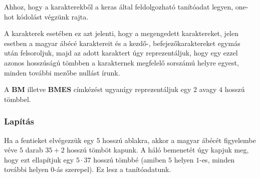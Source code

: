 \documentclass[a4paper, magyar]{article}
\begin{document}
Ahhoz, hogy a karakterekből a keras által feldolgozható tanítóadat legyen, one-hot kódolást végzünk rajta. 

A karakterek esetében ez azt jelenti, hogy a megengedett karaktereket, jelen esetben a magyar ábécé karaktereit és a kezdő-, befejezőkaraktereket egymás után felsoroljuk, majd az adott karaktert úgy reprezentáljuk, hogy egy ezzel azonos hosszúságú tömbben a karakternek megfelelő sorszámú helyre egyest, minden további mezőbe nullást írunk.

A \textbf{BM} illetve \textbf{BMES} címkézést ugyanígy reprezentáljuk egy $2$ avagy $4$ hosszú tömbbel. 

\subsubsection{Lapítás}

Ha a fentieket elvégezzük egy $5$ hosszú ablakra, akkor a magyar ábécét figyelembe véve $5$ darab $35+2$ hosszú tömböt kapunk. A háló bemenetét úgy kapjuk meg, hogy ezt ellapítjuk egy $5\cdot37$ hosszú tömbbé (amiben $5$ helyen $1$-es, minden további helyen $0$-ás szerepel). Ez lesz a tanítóadatunk.
\end{document}
